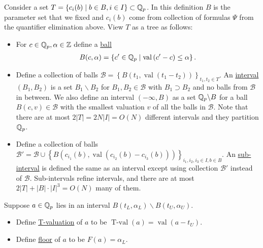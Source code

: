 \documentclass{amsart}
\newcommand{\BB}{\mathscr B}
\newcommand{\curly}[1]{\left\{#1\right\}}
\newcommand{\paren}[1]{\left(#1\right)}
\DeclareMathOperator{\vval}{val}
\DeclareMathOperator{\tval}{T-val}
\newcommand{\defn}{\underline}
\begin{document}
Consider a set $T = \curly{c_i(b) \mid b \in B, i \in I} \subset \Q_p$.
In this definition $B$ is the parameter set that we fixed 
and $c_i(b)$ come from collection of formulas $\Psi$ from the quantifier elimination above.
View $T$ as a tree as follows:
\begin{Definition}
  \begin{itemize}
  \item For $c \in \mathbb{Q}_p, \alpha \in \mathbb{Z}$  define a \defn{ball} 
    \begin{align*}
      B(c, \alpha) = \curly{c' \in \Q_p \mid \vval \paren{c' - c} \leq \alpha}.  
    \end{align*}
  \item Define a collection of balls $\BB = \curly{B(t_1, \vval(t_1 - t_2))}_{t_1, t_2 \in T}$.
    An \defn{interval} $(B_1, B_2)$ is a set $B_1 \backslash B_2$
    for $B_1, B_2 \in \BB$ with $B_1 \supset B_2$ and no balls from $\BB$ in between.
    We also define an interval $(-\infty, B)$ as a set $\mathbb{Q}_p \backslash B$ for a ball $B(c, v) \in \BB$
    with the smallest valuation $v$ of all the balls in $\BB$.
    Note that there are at most $2|T| = 2 N |I| = O(N)$ different intervals and they partition $\mathbb{Q}_p$.
  \item Define a collection of balls $\BB' = \BB \cup \curly{B(c_{i_1}(b), \vval(c_{i_2}(b) - c_{i_3}(b)))}_{i_1, i_2, i_3 \in I, b\in B}$.
    An \defn{sub-interval} is defined the same as an interval except using collection $\BB'$ instead of $\BB$.
    Sub-intervals refine intervals, and there are at most $2|T| + |B| \cdot |I|^3 = O(N)$ many of them.
  \end{itemize}
 \end{Definition}

\begin{Definition}
  Suppose $a \in \mathbb{Q}_p$ lies in an interval $B(t_L, \alpha_L) \backslash B(t_U, \alpha_U)$.
  \begin{itemize}
  \item Define \defn{T-valuation} of $a$ to be $\tval(a) = \vval(a - t_U)$.    
  \item Define \defn{floor} of $a$ to be $F(a) = \alpha_L$.
  \end{itemize}
\end{Definition}
\end{document}
